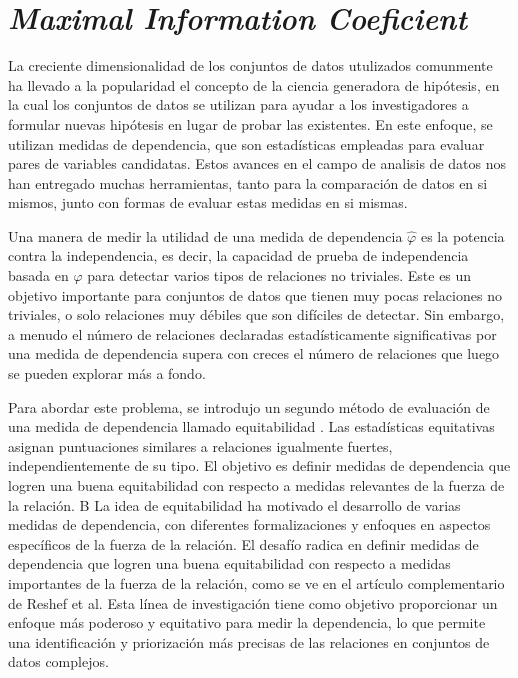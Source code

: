 \chapter{\textit{Maximal Information Coeficient}}

La creciente dimensionalidad de los conjuntos de datos utulizados comunmente ha llevado a la popularidad el concepto de la ciencia generadora de hip\'otesis, en la cual los conjuntos de datos se utilizan para ayudar a los investigadores a formular nuevas hip\'otesis en lugar de probar las existentes. En este enfoque, se utilizan medidas de dependencia, que son estad\'isticas empleadas para evaluar pares de variables candidatas. Estos avances en el campo de analisis de datos nos han entregado muchas herramientas, tanto para la comparaci\'on de datos en si mismos, junto con formas de evaluar estas medidas en si mismas. 

Una manera de medir la utilidad de una medida de dependencia $\hat\varphi$ es la potencia contra la independencia, es decir, la capacidad de prueba de independencia basada en $\hat\varphi$ para detectar varios tipos de relaciones no triviales. Este es un objetivo importante para conjuntos de datos que tienen muy pocas relaciones no triviales, o solo relaciones muy d\'ebiles que son dif\'iciles de detectar. Sin embargo, a menudo el n\'umero de relaciones declaradas estad\'isticamente significativas por una medida de dependencia supera con creces el n\'umero de relaciones que luego se pueden explorar m\'as a fondo.

Para abordar este problema, se introdujo un segundo m\'etodo de evaluaci\'on de una medida de dependencia llamado equitabilidad \cite{Reshef2011}. Las estad\'isticas equitativas asignan puntuaciones similares a relaciones igualmente fuertes, independientemente de su tipo. El objetivo es definir medidas de dependencia que logren una buena equitabilidad con respecto a medidas relevantes de la fuerza de la relaci\'on. 
B
La idea de equitabilidad ha motivado el desarrollo de varias medidas de dependencia, con diferentes formalizaciones y enfoques en aspectos espec\'ificos de la fuerza de la relaci\'on. El desaf\'io radica en definir medidas de dependencia que logren una buena equitabilidad con respecto a medidas importantes de la fuerza de la relaci\'on, como se ve en el art\'iculo complementario de Reshef et al. Esta l\'inea de investigaci\'on tiene como objetivo proporcionar un enfoque m\'as poderoso y equitativo para medir la dependencia, lo que permite una identificaci\'on y priorizaci\'on m\'as precisas de las relaciones en conjuntos de datos complejos.

